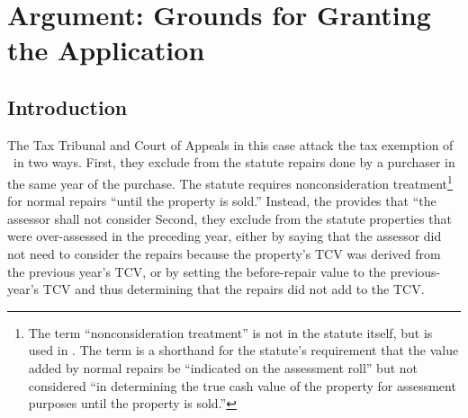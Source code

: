 \documentclass[12pt,\documentclassflag]{michiganCourtOfAppealsBrief}
\begin{document}

\section{Argument: Grounds for Granting the Application}

\subsection{Introduction}

The Tax Tribunal and Court of Appeals in this case attack the tax exemption of \mathieuGast\ in two ways. First, they exclude from the statute repairs done by a purchaser in the same year of the purchase. The statute requires nonconsideration treatment\footnote{The term ``nonconsideration treatment'' is not in the statute itself, but is used in \cite{STC Bulletin}. The term is a shorthand for the statute's requirement that the value added by normal repairs be ``indicated on the assessment roll'' but not considered ``in determining the true cash value of the property for assessment purposes until the property is sold.''} for normal repairs ``until the property is sold.'' Instead, the provides that ``the assessor shall not consider Second, they exclude from the statute properties that were over-assessed in the preceding year, either by saying that the assessor did not need to consider the repairs because the property's TCV was derived from the previous year's TCV, or by setting the before-repair value to the previous-year's TCV and thus determining that the repairs did not add to the TCV.

\end{document}
